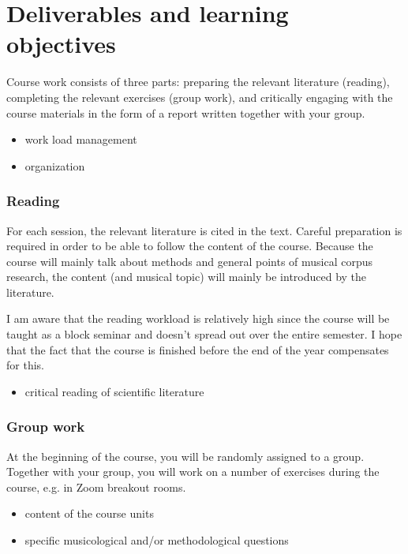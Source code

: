 \documentclass[letterpaper,10pt,english]{sphinxmanual}
\begin{document}
\section{Deliverables and learning objectives}
\label{\detokenize{1_orga:deliverables-and-learning-objectives}}
Course work consists of three parts: preparing the relevant literature (reading),
completing the relevant exercises (group work), and critically engaging with the course materials
in the form of a report written together with your group.
\begin{itemize}
\item {} 
work load management

\item {} 
organization

\end{itemize}
\subsubsection*{Reading}

For each session, the relevant literature is cited in the text.
Careful preparation is required in order to be able to follow the content of the course.
Because the course will mainly talk about methods and general points of musical corpus research,
the content (and musical topic) will mainly be introduced by the literature.

I am aware that the reading workload is relatively high since the course will be taught as a block seminar
and doesn’t spread out over the entire semester. I hope that the fact that the course is finished before the
end of the year compensates for this.
\begin{itemize}
\item {} 
critical reading of scientific literature

\end{itemize}
\subsubsection*{Group work}

At the beginning of the course, you will be randomly assigned to a group.
Together with your group, you will work on a number of exercises during the course,
e.g. in Zoom breakout rooms.
\begin{itemize}
\item {} 
content of the course units

\item {} 
specific musicological and/or methodological questions

\end{itemize}
\end{document}
